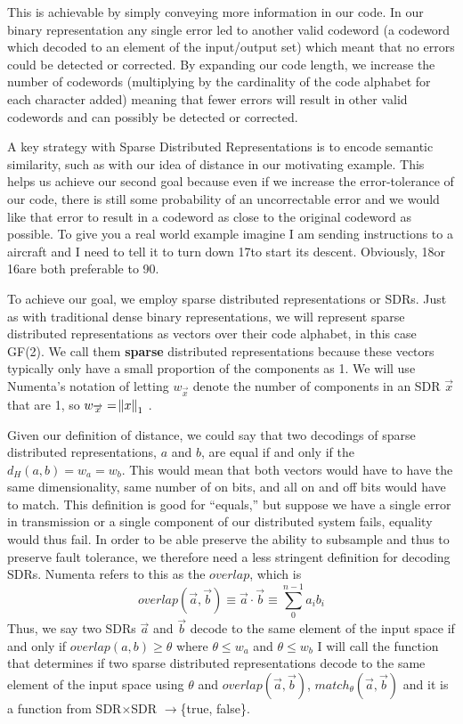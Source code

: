 \documentclass[oneside,12pt,openany]{book}
\begin{document}
	This is achievable by simply conveying more information in our code. In our binary representation any single error led to another valid codeword (a codeword which decoded to an element of the input/output set) which meant that no errors could be detected or corrected. By expanding our code length, we increase the number of codewords (multiplying by the cardinality of the code alphabet for each character added) meaning that fewer errors will result in other valid codewords and can possibly be detected or corrected. 
	
	A key strategy with Sparse Distributed Representations is to encode semantic similarity, such as with our idea of distance in our motivating example. This helps us achieve our second goal because even if we increase the error-tolerance of our code, there is still some probability of an uncorrectable error and we would like that error to result in a codeword as close to the original codeword as possible. To give you a real world example imagine I am sending instructions to a aircraft and I need to tell it to turn down 17\textdegree to start its descent. Obviously, 18\textdegree or 16\textdegree are both preferable to 90\textdegree.
	
	To achieve our goal, we employ sparse distributed representations or SDRs. Just as with traditional dense binary representations, we will represent sparse distributed representations as vectors over their code alphabet, in this case GF(2). We call them \textbf{sparse} distributed representations because these vectors typically only have a small proportion of the components as 1. We will use Numenta's notation of letting $w_{\overrightarrow{x}}$ denote the number of components in an SDR $\overrightarrow{x}$ that are 1, so $w_{\overrightarrow{x}} = \norm{x}_{1}$ \cite{Properties}.
	
	Given our definition of distance, we could say that two decodings of sparse distributed representations, $a$ and $b$, are equal if and only if the $d_{H}(a,b) = w_{a} = w_{b}$. This would mean that both vectors would have to have the same dimensionality, same number of on bits, and all on and off bits would have to match. This definition is good for ``equals,'' but suppose we have a single error in transmission or a single component of our distributed system fails, equality would thus fail. In order to be able preserve the ability to subsample and thus to preserve fault tolerance, we therefore need a less stringent definition for decoding SDRs. Numenta refers to this as the $overlap$, which is $$ overlap(\overrightarrow{a}, \overrightarrow{b}) \equiv \overrightarrow{a} \cdot \overrightarrow{b} \equiv \sum_{0}^{n-1} a_{i}b_{i}$$ Thus, we say two SDRs $\overrightarrow{a}$ and $\overrightarrow{b}$ decode to the same element of the input space if and only if $overlap(a,b) \geq \theta$ where $\theta \leq w_{a}$ and $\theta \leq w_{b}$ \cite{Properties} I will call the function that determines if two sparse distributed representations decode to the same element of the input space using $\theta$ and $overlap(\overrightarrow{a}, \overrightarrow{b})$, $match_{\theta}(\overrightarrow{a}, \overrightarrow{b})$ and it is a function from SDR$\times$SDR $\longrightarrow$\{true, false\}.
	
\end{document}
